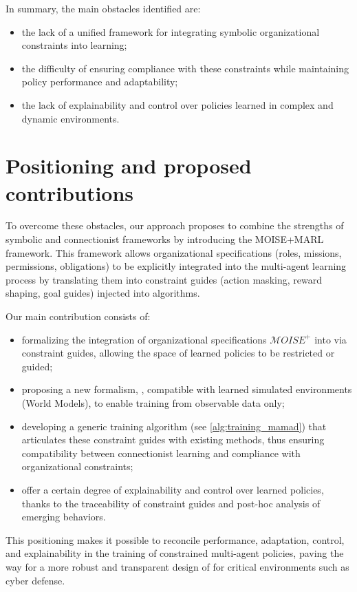 In summary, the main obstacles identified are:
\begin{itemize}
  \item the lack of a unified framework for integrating symbolic organizational constraints into  learning;
  \item the difficulty of ensuring compliance with these constraints while maintaining policy performance and adaptability;
  \item the lack of explainability and control over policies learned in complex and dynamic environments.
\end{itemize}

\section{Positioning and proposed contributions}

To overcome these obstacles, our approach proposes to combine the strengths of symbolic and connectionist frameworks by introducing the MOISE+MARL framework. This framework allows organizational specifications (roles, missions, permissions, obligations) to be explicitly integrated into the multi-agent learning process by translating them into constraint guides (action masking, reward shaping, goal guides) injected into  algorithms.

Our main contribution consists of:
\begin{itemize}
  \item formalizing the integration of organizational specifications $\mathcal{M}OISE^+$ into  via constraint guides, allowing the space of learned policies to be restricted or guided;
  \item proposing a new formalism, , compatible with learned simulated environments (World Models), to enable training from observable data only;
  \item developing a generic training algorithm (see \autoref{alg:training_mamad}) that articulates these constraint guides with existing  methods, thus ensuring compatibility between connectionist learning and compliance with organizational constraints;
  \item offer a certain degree of explainability and control over learned policies, thanks to the traceability of constraint guides and post-hoc analysis of emerging behaviors.
\end{itemize}

This positioning makes it possible to reconcile performance, adaptation, control, and explainability in the training of constrained multi-agent policies, paving the way for a more robust and transparent design of  for critical environments such as cyber defense.

